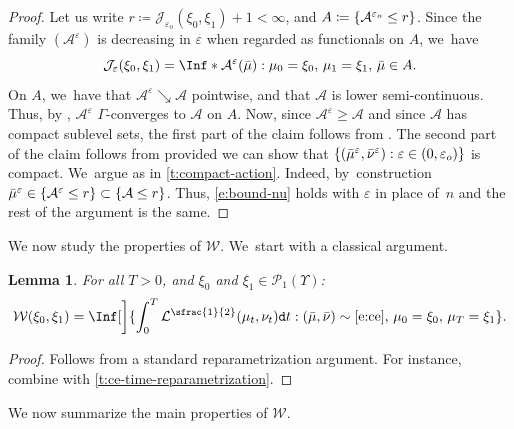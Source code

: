 \documentclass[10pt]{amsart}
\newtheorem{lemma}[theorem]{Lemma}
\theoremstyle{definition}
\theoremstyle{remark}
\DeclarePairedDelimiter{\set}{\lbrace}{\rbrace}
\begin{document}
\begin{proof}
Let us write $r \coloneq \mathcal{J}_{\varepsilon_{o}}(\xi_{0}, \xi_{1}) + 1 < \infty$, and $A \coloneq \set{ \mathcal{A}^{\varepsilon_{o}} \leq r }$.
Since the family $( \mathcal{A}^{\varepsilon} )$ is decreasing in $\varepsilon$ when regarded as functionals on $A$, we~have
\begin{equation*}
\mathcal{J}_{\varepsilon}(\xi_{0}, \xi_{1}) = \Inf*{ \mathcal{A}^{\varepsilon}(\bar{\mu}) : \mu_{0} = \xi_{0},\, \mu_{1} = \xi_{1},\, \bar{\mu} \in A }.
\end{equation*}
On $A$, we~have that $\mathcal{A}^{\varepsilon} \searrow \mathcal{A}$ pointwise, and that $\mathcal{A}$ is lower semi-continuous.
Thus, by \cite[Prop.\,5.7]{DalMaso}, $\mathcal{A}^{\varepsilon}$ $\Gamma$-converges to $\mathcal{A}$ on $A$.
Now, since $\mathcal{A}^{\varepsilon} \geq \mathcal{A}$ and since $\mathcal{A}$ has compact sublevel sets, the first part of the claim follows from \cite[Prop.\,7.7 \& Th.\,7.8]{DalMaso}.
The second part of the claim follows from \cite[Cor.\,7.20]{DalMaso} provided we can show that $\set{ (\bar{\mu}^{\varepsilon}, \bar{\nu}^{\varepsilon}) : \varepsilon \in (0, \varepsilon_{o}) }$ is compact. We~argue as in \cref{t:compact-action}.
Indeed, by~construction $\bar{\mu}^{\varepsilon} \in \set{ \mathcal{A}^{\varepsilon} \leq r } \subset \set{ \mathcal{A} \leq r }$.
Thus, \cref{e:bound-nu} holds with $\varepsilon$ in place of~$n$ and the rest of the argument is the same.
\end{proof}

We now study the properties of $\mathcal{W}$. We~start with a classical argument.
\begin{lemma}\label{t:wcurl-time-reparametrization}
For all $T > 0$, and $\xi_{0}$ and $\xi_{1} \in \mathscr{P}_{1}(\varUpsilon)$:
\begin{equation*}
\mathcal{W}(\xi_{0}, \xi_{1}) = \Inf[\bigg]{ \int_{0}^{T} \mathcal{L}^{\sfrac{1}{2}}(\mu_{t}, \nu_{t}) \mathtt{d} t : (\bar{\mu}, \bar{\nu}) \sim \cref{e:ce},\, \mu_{0} = \xi_{0},\, \mu_{T} = \xi_{1} }.
\end{equation*}
\end{lemma}
\begin{proof}
Follows from a standard reparametrization argument.
For instance, combine \cite[Th.\,5.4]{DNS09} with \cref{t:ce-time-reparametrization}.
\end{proof}

We now summarize the main properties of $\mathcal{W}$.
\skpt
\end{document}
